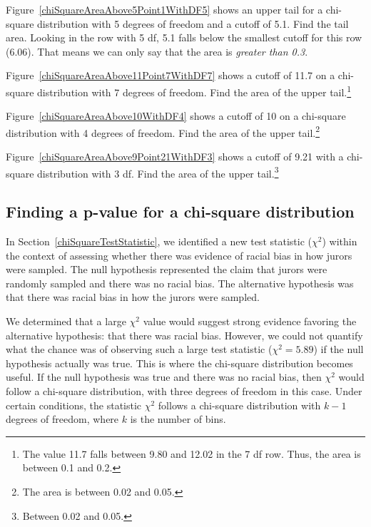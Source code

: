 \begin{example}{Figure~\ref{chiSquareAreaAbove5Point1WithDF5} shows an upper tail for a chi-square distribution with 5 degrees of freedom and a cutoff of 5.1. Find the tail area.}
Looking in the row with 5 df, 5.1 falls below the smallest cutoff for this row (6.06). That means we can only say that the area is \emph{greater than 0.3}.
\end{example}

\begin{exercise}
Figure~\ref{chiSquareAreaAbove11Point7WithDF7} shows a cutoff of 11.7 on a chi-square distribution with 7 degrees of freedom. Find the area of the upper tail.\footnote{The value 11.7 falls between 9.80 and 12.02 in the 7 df row. Thus, the area is between 0.1 and 0.2.}
\end{exercise}

\begin{exercise}
Figure~\ref{chiSquareAreaAbove10WithDF4} shows a cutoff of 10 on a chi-square distribution with 4 degrees of freedom. Find the area of the upper tail.\footnote{The area is between 0.02 and 0.05.}
\end{exercise}

\begin{exercise}
Figure~\ref{chiSquareAreaAbove9Point21WithDF3} shows a cutoff of 9.21 with a chi-square distribution with 3 df. Find the area of the upper tail.\footnote{Between 0.02 and 0.05.}
\end{exercise}


\subsection{Finding a p-value for a chi-square distribution}
\label{pValueForAChiSquareTest}

In Section~\ref{chiSquareTestStatistic}, we identified a new test statistic ($\chi^2$) within the context of assessing whether there was evidence of racial bias in how jurors were sampled. The null hypothesis represented the claim that jurors were randomly sampled and there was no racial bias. The alternative hypothesis was that there was racial bias in how the jurors were sampled.

We determined that a large $\chi^2$ value would suggest strong evidence favoring the alternative hypothesis: that there was racial bias. However, we could not quantify what the chance was of observing such a large test statistic ($\chi^2=5.89$) if the null hypothesis actually was true. This is where the chi-square distribution becomes useful. If the null hypothesis was true and there was no racial bias, then $\chi^2$ would follow a chi-square distribution, with three degrees of freedom in this case. Under certain conditions, the statistic $\chi^2$ follows a chi-square distribution with $k - 1$ degrees of freedom, where $k$ is the number of bins.

